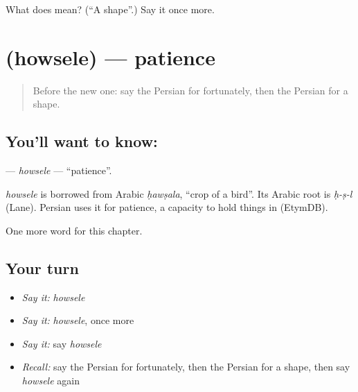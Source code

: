 \begin{tcolorbox}[breakable,colback=teal!4,colframe=teal!35!black,title={Before you move on}]
What does  mean? (\textquotedblleft{}A shape\textquotedblright{}.) Say it once more.
\end{tcolorbox}
\section[\texorpdfstring{\fa{حوصله} (howsele)}{حوصله (howsele)}]{ (howsele) — patience}

\label{lesson:FA-C270-howsele}



\begin{quote}
Before the new one: say the Persian for fortunately, then the Persian for a shape.
\end{quote}

\subsection*{You'll want to know: }
\textbf{} — \emph{howsele} — \textquotedblleft{}patience\textquotedblright{}.

\begin{cousinweb}
\emph{howsele} is borrowed from Arabic \emph{ḥawṣala}, \textquotedblleft{}crop of a bird\textquotedblright{}. Its Arabic root is \emph{ḥ-ṣ-l} (Lane). Persian uses it for patience, a capacity to hold things in (EtymDB).
\end{cousinweb}

\begin{grammarlens}[title={What you've built}]
One more word for this chapter.
\end{grammarlens}

\subsection*{Your turn}
\begin{itemize}
\raggedright
  \item \emph{Say it:} \emph{howsele}
  \item \emph{Say it:} \emph{howsele}, once more
  \item \emph{Say it:} say \emph{howsele}
  \item \emph{Recall:} say the Persian for fortunately, then the Persian for a shape, then say \emph{howsele} again
\end{itemize}

